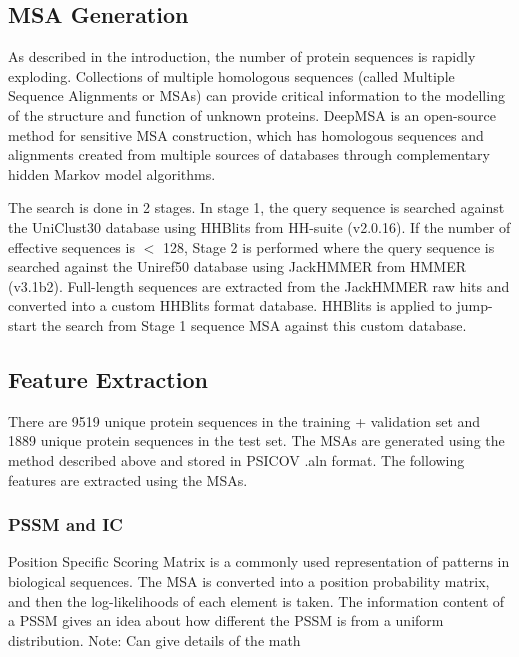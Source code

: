 \documentclass[journal=jacsat,manuscript=article]{achemso}
\begin{document}
\subsection{MSA Generation}
As described in the introduction, the number of protein sequences is rapidly exploding. Collections of multiple homologous sequences (called Multiple Sequence Alignments or MSAs) can provide critical information to the modelling of the structure and function of unknown proteins. DeepMSA \cite{zhang2020deepmsa} is an open-source method for sensitive MSA construction, which has homologous sequences and alignments created from multiple sources of databases through complementary hidden Markov model algorithms.

The search is done in 2 stages. In stage 1, the query sequence is searched against the UniClust30 \cite{mirdita2017uniclust} database using HHBlits from HH-suite\cite{remmert2012hhblits} (v2.0.16). If the number of effective sequences is $<$ 128, Stage 2 is performed where the query sequence is searched against the Uniref50 \cite{suzek2015uniref} database using JackHMMER from HMMER \cite{johnson2010hidden} (v3.1b2). Full-length sequences are extracted from the JackHMMER raw hits and converted into a custom HHBlits format database. HHBlits is applied to jump-start the search from Stage 1 sequence MSA against this custom database.


\subsection{Feature Extraction}
There are 9519 unique protein sequences in the training + validation set and 1889 unique protein sequences in the test set. The MSAs are generated using the method described above and stored in PSICOV \cite{jones2012psicov} .aln format. The following features are extracted using the MSAs.

\subsubsection{PSSM and IC}
Position Specific Scoring Matrix is a commonly used representation of patterns in biological sequences. The MSA is converted into a position probability matrix, and then the log-likelihoods of each element is taken. The information content of a PSSM gives an idea about how different the PSSM is from a uniform distribution.
Note: Can give details of the math
\end{document}
